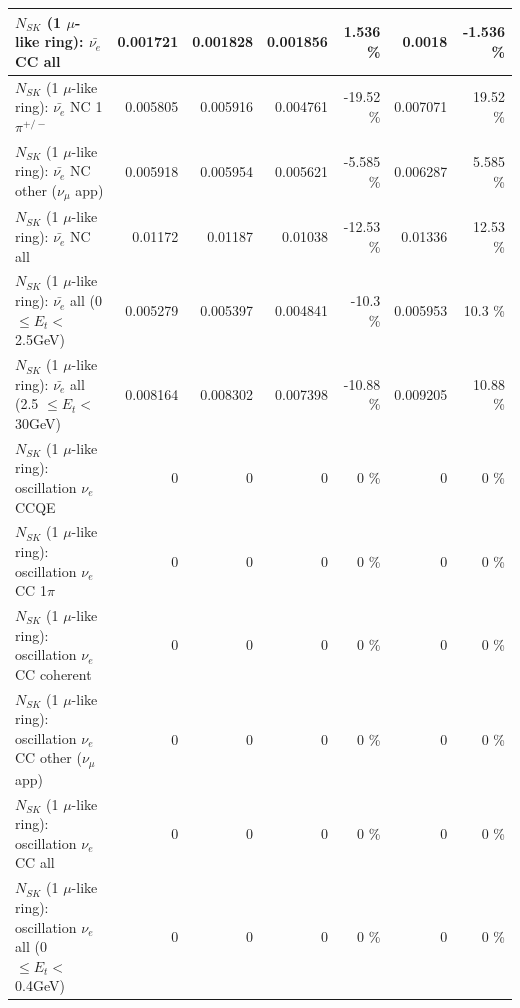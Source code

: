 \begin{table}
\begin{tabular}{| l | r | r | r  r | r  r |}
                            $N_{SK}$ (1 $\mu$-like ring): $\bar{\nu_{e}}$ CC all &        0.001721 &        0.001828 &        0.001856 &    1.536 \%  &          0.0018 &   -1.536 \%  \\ 
\hline
                     $N_{SK}$ (1 $\mu$-like ring): $\bar{\nu_e}$ NC 1$\pi^{+/-}$ &        0.005805 &        0.005916 &        0.004761 &   -19.52 \%  &        0.007071 &    19.52 \%  \\ 
            $N_{SK}$ (1 $\mu$-like ring): $\bar{\nu_e}$ NC other ($\nu_\mu$ app) &        0.005918 &        0.005954 &        0.005621 &   -5.585 \%  &        0.006287 &    5.585 \%  \\ 
                            $N_{SK}$ (1 $\mu$-like ring): $\bar{\nu_{e}}$ NC all &         0.01172 &         0.01187 &         0.01038 &   -12.53 \%  &         0.01336 &    12.53 \%  \\ 
\hline
     $N_{SK}$ (1 $\mu$-like ring): $\bar{\nu_{e}}$ all (0 $\leq E_{t} <$ 2.5GeV) &        0.005279 &        0.005397 &        0.004841 &    -10.3 \%  &        0.005953 &     10.3 \%  \\ 
    $N_{SK}$ (1 $\mu$-like ring): $\bar{\nu_{e}}$ all (2.5 $\leq E_{t} <$ 30GeV) &        0.008164 &        0.008302 &        0.007398 &   -10.88 \%  &        0.009205 &    10.88 \%  \\ 
\hline
\hline
\hline
                          $N_{SK}$ (1 $\mu$-like ring): oscillation $\nu_e$ CCQE &               0 &               0 &               0 &        0 \%  &               0 &        0 \%  \\ 
                     $N_{SK}$ (1 $\mu$-like ring): oscillation $\nu_e$ CC 1$\pi$ &               0 &               0 &               0 &        0 \%  &               0 &        0 \%  \\ 
                   $N_{SK}$ (1 $\mu$-like ring): oscillation $\nu_e$ CC coherent &               0 &               0 &               0 &        0 \%  &               0 &        0 \%  \\ 
      $N_{SK}$ (1 $\mu$-like ring): oscillation $\nu_e$ CC other ($\nu_\mu$ app) &               0 &               0 &               0 &        0 \%  &               0 &        0 \%  \\ 
                       $N_{SK}$ (1 $\mu$-like ring): oscillation $\nu_e$  CC all &               0 &               0 &               0 &        0 \%  &               0 &        0 \%  \\ 
\hline
$N_{SK}$ (1 $\mu$-like ring): oscillation $\nu_{e}$ all (0 $\leq E_{t} <$ 0.4GeV) &               0 &               0 &               0 &        0 \%  &               0 &        0 \%  \\ 

\end{tabular}
\end{table}
